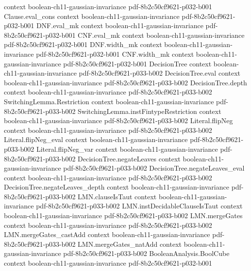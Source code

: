 \begin{lemma}
  {context}
  {boolean-ch11-gaussian-invariance}
  {pdf-8b2c50cf9621-p032-b001}
\proofstep
  {Clause.eval_cons}
  {context}
  {boolean-ch11-gaussian-invariance}
  {pdf-8b2c50cf9621-p032-b001}
\proofstep
  {DNF.eval_mk}
  {context}
  {boolean-ch11-gaussian-invariance}
  {pdf-8b2c50cf9621-p032-b001}
\proofstep
  {CNF.eval_mk}
  {context}
  {boolean-ch11-gaussian-invariance}
  {pdf-8b2c50cf9621-p032-b001}
\proofstep
  {DNF.width_mk}
  {context}
  {boolean-ch11-gaussian-invariance}
  {pdf-8b2c50cf9621-p032-b001}
\proofstep
  {CNF.width_mk}
  {context}
  {boolean-ch11-gaussian-invariance}
  {pdf-8b2c50cf9621-p032-b001}
\proofstep
  {DecisionTree}
  {context}
  {boolean-ch11-gaussian-invariance}
  {pdf-8b2c50cf9621-p033-b002}
\proofstep
  {DecisionTree.eval}
  {context}
  {boolean-ch11-gaussian-invariance}
  {pdf-8b2c50cf9621-p033-b002}
\proofstep
  {DecisionTree.depth}
  {context}
  {boolean-ch11-gaussian-invariance}
  {pdf-8b2c50cf9621-p033-b002}
\proofstep
  {SwitchingLemma.Restriction}
  {context}
  {boolean-ch11-gaussian-invariance}
  {pdf-8b2c50cf9621-p033-b002}
\proofstep
  {SwitchingLemma.instFintypeRestriction}
  {context}
  {boolean-ch11-gaussian-invariance}
  {pdf-8b2c50cf9621-p033-b002}
\proofstep
  {Literal.flipNeg}
  {context}
  {boolean-ch11-gaussian-invariance}
  {pdf-8b2c50cf9621-p033-b002}
\proofstep
  {Literal.flipNeg_eval}
  {context}
  {boolean-ch11-gaussian-invariance}
  {pdf-8b2c50cf9621-p033-b002}
\proofstep
  {Literal.flipNeg_var}
  {context}
  {boolean-ch11-gaussian-invariance}
  {pdf-8b2c50cf9621-p033-b002}
\proofstep
  {DecisionTree.negateLeaves}
  {context}
  {boolean-ch11-gaussian-invariance}
  {pdf-8b2c50cf9621-p033-b002}
\proofstep
  {DecisionTree.negateLeaves_eval}
  {context}
  {boolean-ch11-gaussian-invariance}
  {pdf-8b2c50cf9621-p033-b002}
\proofstep
  {DecisionTree.negateLeaves_depth}
  {context}
  {boolean-ch11-gaussian-invariance}
  {pdf-8b2c50cf9621-p033-b002}
\proofstep
  {LMN.clauseIsTaut}
  {context}
  {boolean-ch11-gaussian-invariance}
  {pdf-8b2c50cf9621-p033-b002}
\proofstep
  {LMN.instDecidableClauseIsTaut}
  {context}
  {boolean-ch11-gaussian-invariance}
  {pdf-8b2c50cf9621-p033-b002}
\proofstep
  {LMN.mergeGates}
  {context}
  {boolean-ch11-gaussian-invariance}
  {pdf-8b2c50cf9621-p033-b002}
\proofstep
  {LMN.mergeGates_castAdd}
  {context}
  {boolean-ch11-gaussian-invariance}
  {pdf-8b2c50cf9621-p033-b002}
\proofstep
  {LMN.mergeGates_natAdd}
  {context}
  {boolean-ch11-gaussian-invariance}
  {pdf-8b2c50cf9621-p033-b002}
\proofstep
  {BooleanAnalysis.BoolCube}
  {context}
  {boolean-ch11-gaussian-invariance}
  {pdf-8b2c50cf9621-p032-b001}

\end{lemma}
